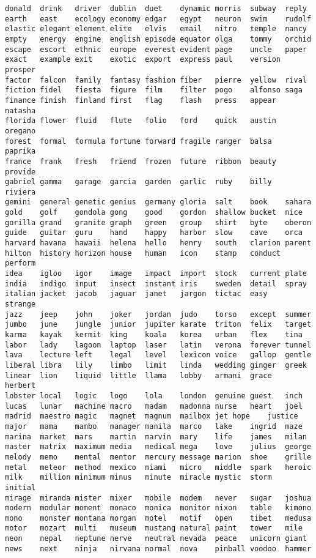 \begin{verbatim}
donald	drink	driver	dublin	duet	dynamic	morris	subway	reply
earth	east	ecology	economy	edgar	egypt	neuron	swim	rudolf
elastic	elegant	element	elite	elvis	email	nitro	temple	nancy
empty	energy	engine	english	episode	equator	olga	tommy	orchid
escape	escort	ethnic	europe	everest	evident	page	uncle	paper
exact	example	exit	exotic	export	express	paul	version	prosper
factor	falcon	family	fantasy	fashion	fiber	pierre	yellow	rival
fiction	fidel	fiesta	figure	film	filter	pogo	alfonso	saga
finance	finish	finland	first	flag	flash	press	appear	natasha
florida	flower	fluid	flute	folio	ford	quick	austin	oregano
forest	formal	formula	fortune	forward	fragile	ranger	balsa	paprika
france	frank	fresh	friend	frozen	future	ribbon	beauty	provide
gabriel	gamma	garage	garcia	garden	garlic	ruby	billy	riviera
gemini	general	genetic	genius	germany	gloria	salt	book	sahara
gold	golf	gondola	gong	good	gordon	shallow	bucket	nice
gorilla	grand	granite	graph	green	group	shirt	byte	oberon
guide	guitar	guru	hand	happy	harbor	slow	cave	orca
harvard	havana	hawaii	helena	hello	henry	south	clarion	parent
hilton	history	horizon	house	human	icon	stamp	conduct	perform
idea	igloo	igor	image	impact	import	stock	current	plate
india	indigo	input	insect	instant	iris	sweden	detail	spray
italian	jacket	jacob	jaguar	janet	jargon	tictac	easy	strange
jazz	jeep	john	joker	jordan	judo	torso	except	summer
jumbo	june	jungle	junior	jupiter	karate	triton	felix	target
karma	kayak	kermit	king	koala	korea	urban	flex	tina
labor	lady	lagoon	laptop	laser	latin	verona	forever	tunnel
lava	lecture	left	legal	level	lexicon	voice	gallop	gentle
liberal	libra	lily	limbo	limit	linda	wedding	ginger	greek
linear	lion	liquid	little	llama	lobby	armani	grace	herbert
lobster	local	logic	logo	lola	london	genuine	guest	inch
lucas	lunar	machine	macro	madam	madonna	nurse	heart	joel
madrid	maestro	magic	magnet	magnum	mailbox	jet	hope	justice
major	mama	mambo	manager	manila	marco	lake	ingrid	maze
marina	market	mars	martin	marvin	mary	life	james	milan
master	matrix	maximum	media	medical	mega	love	julius	george
melody	memo	mental	mentor	mercury	message	marion	shoe	grille
metal	meteor	method	mexico	miami	micro	middle	spark	heroic
milk	million	minimum	minus	minute	miracle	mystic	storm	initial
mirage	miranda	mister	mixer	mobile	modem	never	sugar	joshua
modern	modular	moment	monaco	monica	monitor	nixon	table	kimono
mono	monster	montana	morgan	motel	motif	open	tibet	medusa
motor	mozart	multi	museum	mustang	natural	paint	tower	mile
neon	nepal	neptune	nerve	neutral	nevada	peace	unicorn	giant
news	next	ninja	nirvana	normal	nova	pinball	voodoo	hammer

\end{verbatim}
